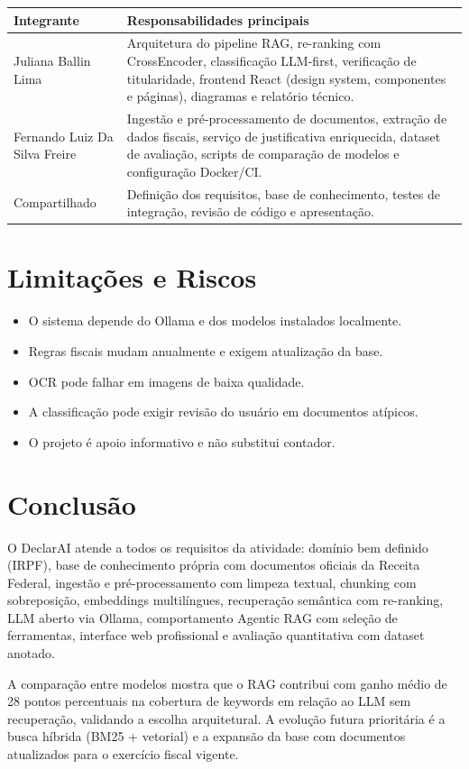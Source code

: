 \documentclass[11pt,a4paper,oneside]{article}
\begin{document}
\begin{center}
\begin{tabularx}{\textwidth}{@{}L{62mm}Y@{}}
\toprule
\textbf{Integrante} & \textbf{Responsabilidades principais} \\
\midrule
Juliana Ballin Lima & Arquitetura do pipeline RAG, re-ranking com CrossEncoder, classificação LLM-first, verificação de titularidade, frontend React (design system, componentes e páginas), diagramas e relatório técnico. \\
Fernando Luiz Da Silva Freire & Ingestão e pré-processamento de documentos, extração de dados fiscais, serviço de justificativa enriquecida, dataset de avaliação, scripts de comparação de modelos e configuração Docker/CI. \\
\midrule
Compartilhado & Definição dos requisitos, base de conhecimento, testes de integração, revisão de código e apresentação. \\
\bottomrule
\end{tabularx}
\end{center}

\section{Limitações e Riscos}

\begin{itemize}[leftmargin=7mm]
  \item O sistema depende do Ollama e dos modelos instalados localmente.
  \item Regras fiscais mudam anualmente e exigem atualização da base.
  \item OCR pode falhar em imagens de baixa qualidade.
  \item A classificação pode exigir revisão do usuário em documentos atípicos.
  \item O projeto é apoio informativo e não substitui contador.
\end{itemize}

\section{Conclusão}

O DeclarAI atende a todos os requisitos da atividade: domínio bem definido (IRPF), base de conhecimento própria com documentos oficiais da Receita Federal, ingestão e pré-processamento com limpeza textual, chunking com sobreposição, embeddings multilíngues, recuperação semântica com re-ranking, LLM aberto via Ollama, comportamento Agentic RAG com seleção de ferramentas, interface web profissional e avaliação quantitativa com dataset anotado.

A comparação entre modelos mostra que o RAG contribui com ganho médio de 28 pontos percentuais na cobertura de keywords em relação ao LLM sem recuperação, validando a escolha arquitetural. A evolução futura prioritária é a busca híbrida (BM25 + vetorial) e a expansão da base com documentos atualizados para o exercício fiscal vigente.
\end{document}
